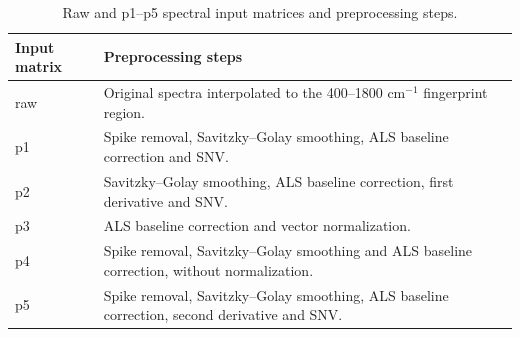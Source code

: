 \begin{table}[htbp]
\centering
\caption{Raw and p1--p5 spectral input matrices and preprocessing steps.}
\label{tab:s1_preprocessing_inputs}
\small
\begin{tabularx}{\textwidth}{L{1.4cm}Y}
\toprule
Input matrix & Preprocessing steps \\
\midrule
raw & Original spectra interpolated to the 400--1800 cm$^{-1}$ fingerprint region. \\
p1 & Spike removal, Savitzky--Golay smoothing, ALS baseline correction and SNV. \\
p2 & Savitzky--Golay smoothing, ALS baseline correction, first derivative and SNV. \\
p3 & ALS baseline correction and vector normalization. \\
p4 & Spike removal, Savitzky--Golay smoothing and ALS baseline correction, without normalization. \\
p5 & Spike removal, Savitzky--Golay smoothing, ALS baseline correction, second derivative and SNV. \\
\bottomrule
\end{tabularx}
\end{table}
